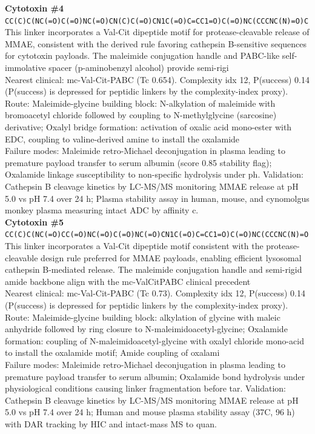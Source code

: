 \documentclass[10pt]{article}
\begin{document}
\noindent\textbf{Cytotoxin \#4} \\ \texttt{CC(C)C(NC(=O)C(=O)NC(=O)CN(C)C(=O)CN1C(=O)C=CC1=O)C(=O)NC(CCCNC(N)=O)C} \\ This linker incorporates a Val-Cit dipeptide motif for protease-cleavable release of MMAE, consistent with the derived rule favoring cathepsin B-sensitive sequences for cytotoxin payloads. The maleimide conjugation handle and PABC-like self-immolative spacer (p-aminobenzyl alcohol) provide semi-rigi \\ Nearest clinical: mc-Val-Cit-PABC (Tc 0.654). Complexity idx 12, P(success) 0.14 (P(success) is depressed for peptidic linkers by the complexity-index proxy). \\ Route: Maleimide-glycine building block: N-alkylation of maleimide with bromoacetyl chloride followed by coupling to N-methylglycine (sarcosine) derivative; Oxalyl bridge formation: activation of oxalic acid mono-ester with EDC, coupling to valine-derived amine to install the oxalamide  \\ Failure modes: Maleimide retro-Michael deconjugation in plasma leading to premature payload transfer to serum albumin (score 0.85 stability flag); Oxalamide linkage susceptibility to non-specific hydrolysis under ph. Validation: Cathepsin B cleavage kinetics by LC-MS/MS monitoring MMAE release at pH 5.0 vs pH 7.4 over 24 h; Plasma stability assay in human, mouse, and cynomolgus monkey plasma measuring intact ADC by affinity c. \\[0.4em]
\noindent\textbf{Cytotoxin \#5} \\ \texttt{CC(C)C(NC(=O)CC(=O)NC(=O)C(=O)NC(=O)CN1C(=O)C=CC1=O)C(=O)NC(CCCNC(N)=O} \\ This linker incorporates a Val-Cit dipeptide motif consistent with the protease-cleavable design rule preferred for MMAE payloads, enabling efficient lysosomal cathepsin B-mediated release. The maleimide conjugation handle and semi-rigid amide backbone align with the mc-ValCitPABC clinical precedent \\ Nearest clinical: mc-Val-Cit-PABC (Tc 0.73). Complexity idx 12, P(success) 0.14 (P(success) is depressed for peptidic linkers by the complexity-index proxy). \\ Route: Maleimide-glycine building block: alkylation of glycine with maleic anhydride followed by ring closure to N-maleimidoacetyl-glycine; Oxalamide formation: coupling of N-maleimidoacetyl-glycine with oxalyl chloride mono-acid to install the oxalamide motif; Amide coupling of oxalami \\ Failure modes: Maleimide retro-Michael deconjugation in plasma leading to premature payload transfer to serum albumin; Oxalamide bond hydrolysis under physiological conditions causing linker fragmentation before tar. Validation: Cathepsin B cleavage kinetics by LC-MS/MS monitoring MMAE release at pH 5.0 vs pH 7.4 over 24 h; Human and mouse plasma stability assay (37\textdegree{}C, 96 h) with DAR tracking by HIC and intact-mass MS to quan. \\[0.4em]
\end{document}
